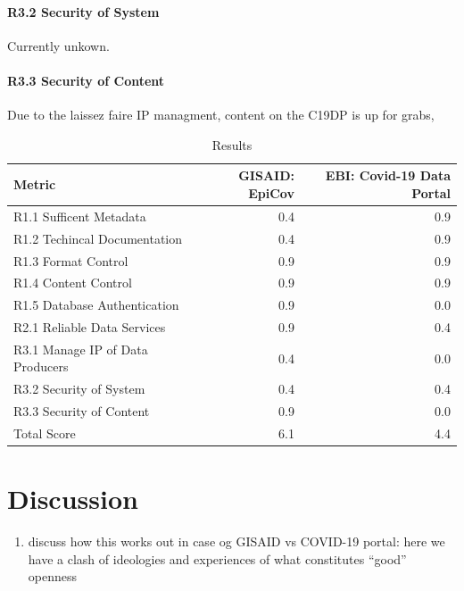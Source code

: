\documentclass{article}
\providecommand{\tightlist}{%
  \setlength{\itemsep}{0pt}\setlength{\parskip}{0pt}}
\begin{document}
\hypertarget{r3.2-security-of-system-1}{%
\paragraph{R3.2 Security of System}\label{r3.2-security-of-system-1}}

Currently unkown.

\hypertarget{r3.3-security-of-content-1}{%
\paragraph{R3.3 Security of Content}\label{r3.3-security-of-content-1}}

Due to the laissez faire IP managment, content on the C19DP is up for
grabs,

\begin{table}[H]

\caption{\label{tab:fig3}Results}
\centering
\begin{tabular}[t]{l|r|r}
\hline
Metric & GISAID: EpiCov & EBI: Covid-19 Data Portal\\
\hline
R1.1 Sufficent Metadata & 0.4 & 0.9\\
\hline
R1.2 Techincal Documentation & 0.4 & 0.9\\
\hline
R1.3 Format Control & 0.9 & 0.9\\
\hline
R1.4 Content Control & 0.9 & 0.9\\
\hline
R1.5  Database Authentication & 0.9 & 0.0\\
\hline
R2.1 Reliable Data Services & 0.9 & 0.4\\
\hline
R3.1 Manage IP of Data Producers & 0.4 & 0.0\\
\hline
R3.2 Security of System & 0.4 & 0.4\\
\hline
R3.3 Security of Content & 0.9 & 0.0\\
\hline
Total Score & 6.1 & 4.4\\
\hline
\end{tabular}
\end{table}

\hypertarget{discussion}{%
\section{Discussion}\label{discussion}}

\begin{enumerate}
\def\labelenumi{(\arabic{enumi})}
\setcounter{enumi}{4}
\tightlist
\item
  discuss how this works out in case og GISAID vs COVID-19 portal: here
  we have a clash of ideologies and experiences of what constitutes
  ``good'' openness
\end{enumerate}
\end{document}
